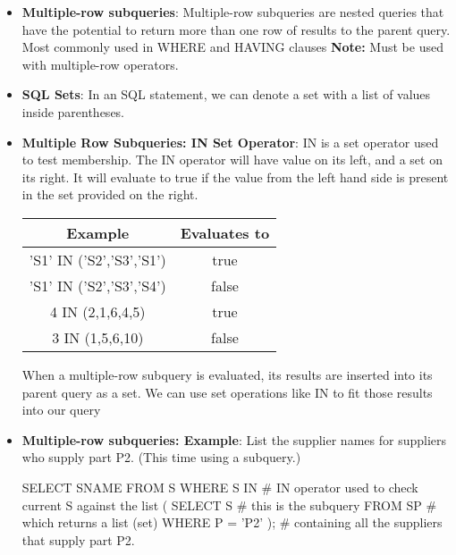 \documentclass{report}
\begin{document}
\begin{itemize}
\begin{sqlcode}
        \end{sqlcode}
    \item \textbf{Multiple-row subqueries}: Multiple-row subqueries are nested queries that have the potential to return more than one row of results to
        the parent query. Most commonly used in WHERE and HAVING clauses
        \bigbreak \noindent 
        \textbf{Note:} Must be used  with multiple-row operators.
    \item \textbf{SQL Sets}: In an SQL statement, we can denote a set with a list of values inside parentheses.
    \item \textbf{Multiple Row Subqueries: IN Set Operator}: IN is a set operator used to test membership.
        \bigbreak \noindent 
        The IN operator will have value on its left, and a set on its right. It will evaluate to true if the value from the left hand side is present in the set provided on the right.
        \bigbreak \noindent 
        \begin{center}
            \begin{center}
                \begin{tabular}{c|c}
                    Example & Evaluates to \\
                    \hline
                    'S1' IN ('S2','S3','S1') & true \\
                    'S1' IN ('S2','S3','S4') &false \\
                    4 IN (2,1,6,4,5) &true \\
                    3 IN (1,5,6,10) &false
                \end{tabular}
            \end{center}
        \end{center}
        \bigbreak \noindent 
        When a multiple-row subquery is evaluated, its results are inserted into its parent query as a set. We can use set operations like IN to fit those results into our query
    \item \textbf{Multiple-row subqueries: Example}: List the supplier names for suppliers who supply part P2. (This time using a subquery.)
        \bigbreak \noindent 
        \begin{sqlcode}
            SELECT SNAME
                FROM S
                WHERE S IN              # IN operator used to check current S against the list
                    ( SELECT S          # this is the subquery
                    FROM SP             # which returns a list (set)
                    WHERE P = 'P2' );   # containing all the suppliers that supply part P2.

\end{sqlcode}
\end{itemize}
\end{document}
